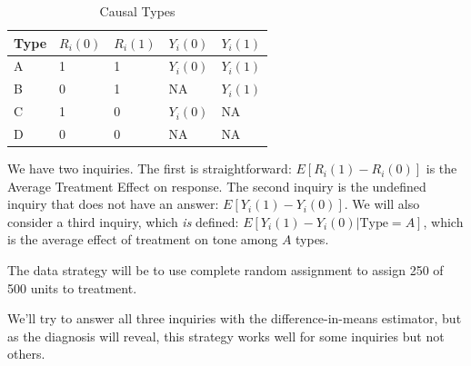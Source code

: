 \documentclass[11pt]{article}\usepackage[]{graphicx}\usepackage[]{color}
\newcommand\I{\bigskip\marginnote{\LARGE \sc I \hspace{.02em}}\noindent}
\newcommand\D{\bigskip\marginnote{\LARGE \sc D}\noindent}
\newcommand\A{\bigskip\marginnote{\LARGE \sc A}\noindent}
\begin{document}
\begin{table}[h]
\centering
\begin{tabular}{lllll}
   Type  &  $R_i(0)$  &  $R_i(1)$  &  $Y_i(0)$   &  $Y_i(1)$  \\ \hline
    A     &  1         &  1         &  $Y_i(0)$   &  $Y_i(1)$  \\
     B     &  0         &  1         &  NA         &  $Y_i(1)$  \\
     C     &  1         &  0         &  $Y_i(0)$   &  NA        \\
     D     &  0         &  0         &  NA         &  NA        
\end{tabular}
\caption{Causal Types}
\end{table}

\vspace{-1em}  \I We have two inquiries. The first is straightforward: $E[R_i(1) - R_i(0)]$ is the Average Treatment Effect on response. The second inquiry is the undefined inquiry that does not have an answer: $E[Y_i(1) - Y_i(0)]$. We will also consider a third inquiry, which {\it is} defined: $E[Y_i(1) - Y_i(0) | \mathrm{Type} = A]$, which is the average effect of treatment on tone among $A$ types.

\D The data strategy will be to use complete random assignment to assign 250 of 500 units to treatment.

\A We'll try to answer all three inquiries with the difference-in-means estimator, but as the diagnosis will reveal, this strategy works well for some inquiries but not others.
\end{document}

